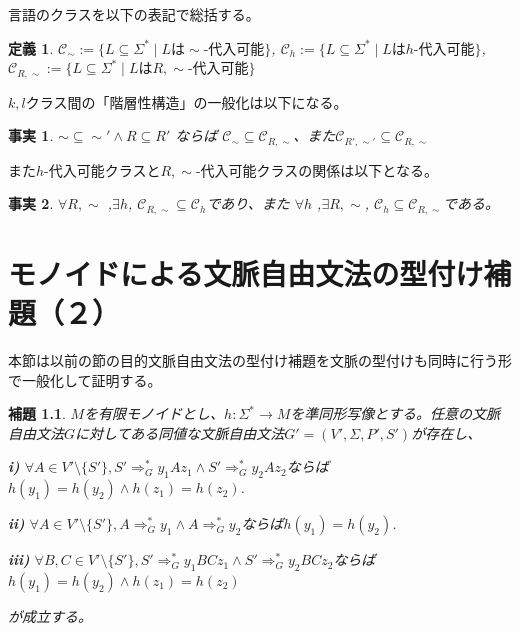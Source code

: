 \documentclass{jsbook}
\newtheorem{lemma}[theorem]{補題}
\newtheorem{definition}{定義}
\newtheorem{fact}{事実}
\begin{document}
言語のクラスを以下の表記で総括する。

\begin{definition}
$\mathcal{C}_{\sim}:=\{L\subseteq\Sigma^*\mid L\mbox{は}\sim\mbox{-代入可能}\}$, $\mathcal{C}_{h}:=\{L\subseteq\Sigma^*\mid L\mbox{は}h\mbox{-代入可能}\}$, $\mathcal{C}_{R,\sim}:=\{L\subseteq\Sigma^*\mid L\mbox{は}R,\sim\mbox{-代入可能}\}$
\end{definition}

$k,l$クラス間の「階層性構造」の一般化は以下になる。

\begin{fact}
$\sim\subseteq\sim'\land R\subseteq R'$ ならば $\mathcal{C}_{\sim}\subseteq\mathcal{C}_{R,\sim}$、また$\mathcal{C}_{R',\sim'}\subseteq\mathcal{C}_{R,\sim}$
\end{fact}

また$h$-代入可能クラスと$R,\sim$-代入可能クラスの関係は以下となる。

\begin{fact}
$\forall R,\sim$ ,$\exists h$, $\mathcal{C}_{R,\sim}\subseteq\mathcal{C}_{h}$であり、また
$\forall h$ ,$\exists R,\sim$, $\mathcal{C}_{h}\subseteq\mathcal{C}_{R,\sim}$である。
\end{fact}

\chapter{モノイドによる文脈自由文法の型付け補題（２）}

本節は以前の節の目的文脈自由文法の型付け補題を文脈の型付けも同時に行う形で一般化して証明する。

\begin{lemma}\label{typinglemma2}
$M$を有限モノイドとし、$h:\Sigma^*\to M$を準同形写像とする。任意の文脈自由文法$G$に対してある同値な文脈自由文法$G'=(V',\Sigma,P',S')$が存在し、

\emph{\bf{i)}} $\forall A\in V'\setminus\{S'\}, S'\Rightarrow^*_Gy_1Az_1\land S'\Rightarrow^*_Gy_2Az_2$ならば$h(y_1)=h(y_2)\land h(z_1)=h(z_2)$.

\emph{\bf{ii)}} $\forall A\in V'\setminus\{S'\}, A\Rightarrow^*_Gy_1\land A\Rightarrow^*_Gy_2$ならば$h(y_1)=h(y_2)$.

\emph{\bf{iii)}} $\forall B,C\in V'\setminus\{S'\}, S'\Rightarrow^*_Gy_1BCz_1\land S'\Rightarrow^*_Gy_2BCz_2$ならば $h(y_1)=h(y_2)\land h(z_1)=h(z_2)$

が成立する。
\end{lemma}
\end{document}
